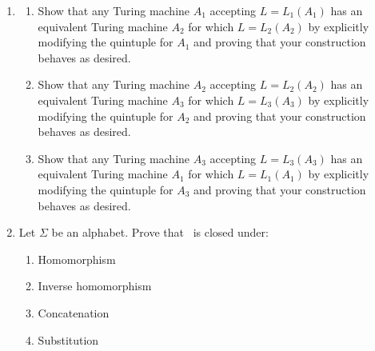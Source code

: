 \begin{enumerate}[{11.}1.]
\item \begin{enumerate}
\item Show that any Turing machine $A_1$ accepting $L=L_1(A_1)$ has an
equivalent Turing machine $A_2$ for which $L=L_2(A_2)$ by explicitly modifying
the quintuple for $A_1$ and proving that your construction behaves as desired.
\item Show that any Turing machine $A_2$ accepting $L=L_2(A_2)$ has an
equivalent Turing machine $A_3$ for which $L=L_3(A_3)$ by explicitly modifying
the quintuple for $A_2$ and proving that your construction behaves as desired.
\item Show that any Turing machine $A_3$ accepting $L=L_3(A_3)$ has an
equivalent Turing machine $A_1$ for which $L=L_1(A_1)$ by explicitly modifying
the quintuple for $A_3$ and proving that your construction behaves as desired.
\end{enumerate}

\item Let $\Sigma$ be an alphabet. Prove that \OSIG\ is closed under:
\begin{enumerate}
\item Homomorphism
\item Inverse homomorphism
\item Concatenation
\item Substitution
\end{enumerate}
\end{enumerate}
